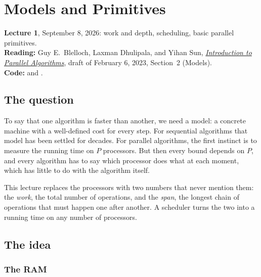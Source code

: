
\chapter{Models and Primitives}
\label{ch:models}

\begin{flushleft}\small
\textbf{Lecture 1}, September 8, 2026: work and depth, scheduling, basic parallel primitives.\\
\textbf{Reading:} Guy E.~Blelloch, Laxman Dhulipala, and Yihan Sun, \href{https://www.cs.umd.edu/~laxman/notes/parallel.pdf}{\emph{Introduction to Parallel Algorithms}}, draft of February 6, 2023, Section~2 (Models).\\
\textbf{Code:}  and .
\end{flushleft}

\section{The question}

To say that one algorithm is faster than another, we need a model: a concrete machine with a well-defined cost for every step. For sequential algorithms that model has been settled for decades. For parallel algorithms, the first instinct is to measure the running time on $P$ processors. But then every bound depends on $P$, and every algorithm has to say which processor does what at each moment, which has little to do with the algorithm itself.

This lecture replaces the processors with two numbers that never mention them: the \emph{work}, the total number of operations, and the \emph{span}, the longest chain of operations that must happen one after another. A scheduler turns the two into a running time on any number of processors.

\section{The idea}

\subsection{The RAM}

